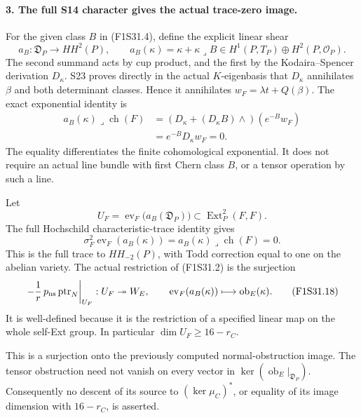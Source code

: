 \paragraph{3. The full S14 character gives the actual trace-zero image.}
For the given class $B$ in (F1S31.4), define the
explicit linear shear
\[
 a_B:\mathfrak D_P\longrightarrow HH^2(P),\qquad
 a_B(\kappa)=\kappa+
              \kappa\mathbin{\lrcorner}B
 \in H^1(P,T_P)\oplus H^2(P,\mathcal O_P).
 \tag{F1S31.14}
\]
The second summand acts by cup product, and the first
by the Kodaira--Spencer derivation $D_\kappa$.
S23 proves directly in the actual $K$-eigenbasis that
$D_\kappa$ annihilates $\beta$ and both determinant
classes. Hence it annihilates
$w_F=\lambda t+Q(\beta)$. The exact exponential identity is
\[
 \begin{split}
 a_B(\kappa)\mathbin{\lrcorner}\operatorname{ch}(F)
  &=\left(D_\kappa+
          (D_\kappa B)\wedge\right)(e^{-B}w_F)\\
  &=e^{-B}D_\kappa w_F=0.
 \end{split}
 \tag{F1S31.15}
\]
The equality differentiates the finite cohomological
exponential. It does not require an actual line bundle
with first Chern class $B$, or a tensor operation by
such a line.

Let
\[
            U_F=\operatorname{ev}_F\bigl(a_B(\mathfrak D_P)\bigr)
                                \subset\operatorname{Ext}^2_P(F,F).
 \tag{F1S31.16}
\]
The full Hochschild characteristic-trace identity gives
\[
              \sigma_F^2\operatorname{ev}_F(a_B(\kappa))
                    =a_B(\kappa)\mathbin{\lrcorner}\operatorname{ch}(F)=0.
 \tag{F1S31.17}
\]
This is the full trace to $HH_{-2}(P)$, with Todd
correction equal to one on the abelian variety.
The actual restriction of (F1S31.2) is the surjection
\[
 \left.-\frac1r\,p_{\rm ns}\operatorname{ptr}_N\right|_{U_F}:
                         U_F\twoheadrightarrow W_E,
 \qquad
 \operatorname{ev}_F(a_B(\kappa))\longmapsto
                                      \operatorname{ob}_E(\kappa).
 \tag{F1S31.18}
\]
It is well-defined because it is the restriction of
a specified linear map on the whole self-Ext group.
In particular $\dim U_F\ge16-r_C$.

This is a surjection onto the previously computed
normal-obstruction image. The tensor obstruction
need not vanish on every vector in
$\ker(\operatorname{ob}_E|_{\mathfrak D_P})$.
Consequently no descent of its source to
$(\ker\mu_C)^*$, or equality of its image dimension
with $16-r_C$, is asserted.

